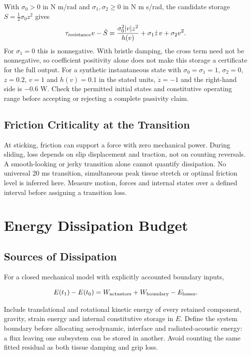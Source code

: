 With $\sigma_0>0$ in N m/rad and $\sigma_1,\sigma_2\geq0$ in N m s/rad, the candidate storage $S=\tfrac12\sigma_0 z^2$ gives
\[
\tau_{\rm resistance}v-\dot S
=\frac{\sigma_0^2|v|z^2}{h(v)}+\sigma_1\dot z\,v+\sigma_2v^2.
\]
For $\sigma_1=0$ this is nonnegative. With bristle damping, the cross term need not be nonnegative, so coefficient positivity alone does not make this storage a certificate for the full output. For a synthetic instantaneous state with $\sigma_0=\sigma_1=1$, $\sigma_2=0$, $z=0.2$, $v=1$ and $h(v)=0.1$ in the stated units, $\dot z=-1$ and the right-hand side is $-0.6$ W. Check the permitted initial states and constitutive operating range before accepting or rejecting a complete passivity claim.

\subsection{Friction Criticality at the
Transition}\label{friction-criticality-at-the-transition}

At sticking, friction can support a force with zero mechanical power. During sliding, loss depends on slip displacement and traction, not on counting reversals. A smooth-looking or jerky transition alone cannot quantify dissipation. No universal 20 ms transition, simultaneous peak tissue stretch or optimal friction level is inferred here. Measure motion, forces and internal states over a defined interval before assigning a transition loss.

\section{Energy Dissipation Budget}\label{sec:energy_budget}\label{energy-dissipation-budget}

\subsection{Sources of Dissipation}\label{sources-of-dissipation}

For a closed mechanical model with explicitly accounted boundary inputs,

\[
E(t_1)-E(t_0)=W_{\rm actuators}+W_{\rm boundary}-E_{\rm losses}.
\]

Include translational and rotational kinetic energy of every retained component, gravity, strain energy and internal constitutive storage in \(E\). Define the system boundary before allocating aerodynamic, interface and radiated-acoustic energy: a flux leaving one subsystem can be stored in another. Avoid counting the same fitted residual as both tissue damping and grip loss.

